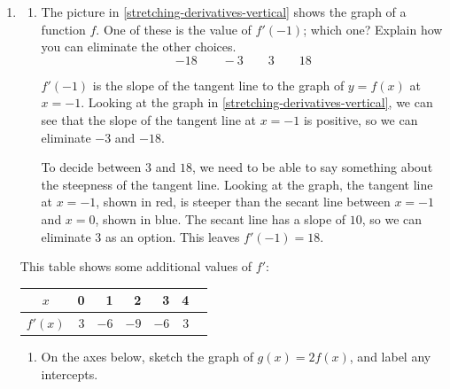 \documentclass{article}
\begin{document}

\begin{enumerate}
\item  \label{stretching-derivatives}

  \begin{enumerate}
  \item


    \begin{problem}[\vfill]
      The picture in \ref{stretching-derivatives-vertical} shows the graph of a function $f$. One of these is the value of $f'(-1)$; which one? Explain how you can eliminate the other choices.
      \[ -18 \qquad -3 \qquad 3 \qquad 18 \]
    \end{problem}

    \begin{solution}
      $f'(-1)$ is the slope of the tangent line to the graph of $y=f(x)$ at $x=-1$.
      Looking at the graph in \ref{stretching-derivatives-vertical}, we can see
      that the slope of the tangent line at $x=-1$ is positive, so we can eliminate
      $-3$ and $-18$. 

      
      To decide between $3$ and $18$, we need to be able to say something about
      the steepness of the tangent line. Looking at the graph, the tangent line at $x=-1$, shown in red, is steeper than the secant
      line between $x=-1$ and $x=0$, shown in blue. 
      The secant line has a slope of $10$, so
      we can eliminate $3$ as an option. This leaves $f'(-1)=18$.
    \end{solution}

  \end{enumerate}
  This table shows some additional values of $f'$:
  \begin{center}
    \begin{tabular}{c | r r r r r r}
      $x$ & 0 & 1 & 2 & 3 & 4 \\
      \hline
      $f'(x)$ & $3$ & $-6$ & $-9$ & $-6$ & $3$
    \end{tabular}
  \end{center}
  \begin{enumerate}[resume, topsep=0pt]
  \item \label{stretching-derivatives-vertical}
    \begin{problem}
      On the axes below, sketch the graph of $g(x) = 2 f(x)$, and label any intercepts.
      

\end{problem}
\end{enumerate}
\end{enumerate}
\end{document}
